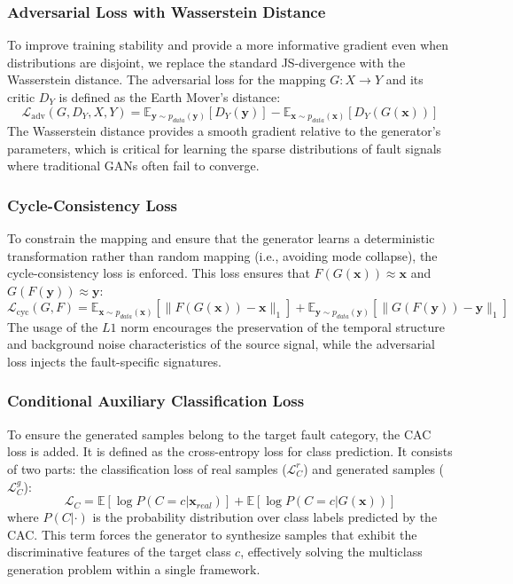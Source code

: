 \subsubsection{Adversarial Loss with Wasserstein Distance}
To improve training stability and provide a more informative gradient even when distributions are disjoint, we replace the standard JS-divergence with the Wasserstein distance. The adversarial loss for the mapping $G: X \to Y$ and its critic $D_Y$ is defined as the Earth Mover's distance:
\begin{equation}
\mathcal{L}_{\text{adv}}(G, D_Y, X, Y) = \mathbb{E}_{\boldsymbol{y} \sim p_{data}(\boldsymbol{y})}[D_Y(\boldsymbol{y})] - \mathbb{E}_{\boldsymbol{x} \sim p_{data}(\boldsymbol{x})}[D_Y(G(\boldsymbol{x}))]
\end{equation}
The Wasserstein distance provides a smooth gradient relative to the generator's parameters, which is critical for learning the sparse distributions of fault signals where traditional GANs often fail to converge.

\subsubsection{Cycle-Consistency Loss}
To constrain the mapping and ensure that the generator learns a deterministic transformation rather than random mapping (i.e., avoiding mode collapse), the cycle-consistency loss is enforced. This loss ensures that $F(G(\boldsymbol{x})) \approx \boldsymbol{x}$ and $G(F(\boldsymbol{y})) \approx \boldsymbol{y}$:
\begin{equation}
\mathcal{L}_{\text{cyc}}(G, F) = \mathbb{E}_{\boldsymbol{x} \sim p_{data}(\boldsymbol{x})} [\|F(G(\boldsymbol{x})) - \boldsymbol{x}\|_1] + \mathbb{E}_{\boldsymbol{y} \sim p_{data}(\boldsymbol{y})} [\|G(F(\boldsymbol{y})) - \boldsymbol{y}\|_1]
\end{equation}
The usage of the $L1$ norm encourages the preservation of the temporal structure and background noise characteristics of the source signal, while the adversarial loss injects the fault-specific signatures.

\subsubsection{Conditional Auxiliary Classification Loss}
To ensure the generated samples belong to the target fault category, the CAC loss is added. It is defined as the cross-entropy loss for class prediction. It consists of two parts: the classification loss of real samples ($\mathcal{L}_{C}^{r}$) and generated samples ($\mathcal{L}_{C}^{g}$):
\begin{equation}
\mathcal{L}_{C} = \mathbb{E}[\log P(C=c | \boldsymbol{x}_{real})] + \mathbb{E}[\log P(C=c | G(\boldsymbol{x}))]
\end{equation}
where $P(C| \cdot)$ is the probability distribution over class labels predicted by the CAC. This term forces the generator to synthesize samples that exhibit the discriminative features of the target class $c$, effectively solving the multiclass generation problem within a single framework.

